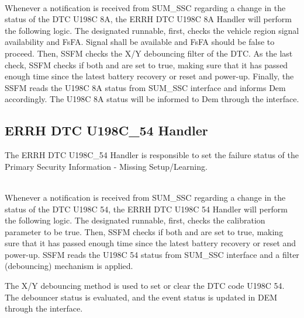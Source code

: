 \\
Whenever a notification is received from SUM_SSC regarding a change in the status of the DTC U198C 8A, the ERRH DTC U198C 8A Handler will perform the following logic.
The designated runnable, first, checks the vehicle region signal availability and FsFA. Signal shall be available and FsFA should be false to proceed.
Then, SSFM checks the X/Y debouncing filter of the DTC.
As the last check, SSFM checks if both  and  are set to true, making sure that it has passed enough time since the latest battery recovery or reset and power-up.
Finally, the SSFM reads the U198C 8A status from SUM_SSC  interface and informs Dem accordingly.
The U198C 8A status will be informed to Dem through the  interface.

{ } 

{}

\subsection{ERRH DTC U198C_54 Handler}
\label{subsection:ERRHDTCU198C54Handler}
The ERRH DTC U198C_54 Handler is responsible to set the failure status of the Primary Security Information - Missing Setup/Learning.

\\
Whenever a notification is received from SUM_SSC regarding a change in the status of the DTC U198C 54, the ERRH DTC U198C 54 Handler will perform the following logic.
The designated runnable, first, checks the calibration parameter  to be true.
Then, SSFM checks if both  and  are set to true, making sure that it has passed enough time since the latest battery recovery or reset and power-up.
SSFM reads the U198C 54 status from SUM_SSC  interface and a filter (debouncing) mechanism is applied.

The X/Y debouncing method is used to set or clear the DTC code U198C 54. The debouncer status is evaluated, and the event status is updated in DEM through the  interface.
{  }



